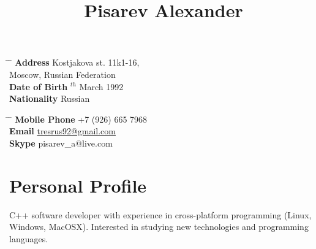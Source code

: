 \documentclass[10pt]{article} %
\begin{document}

\title{Pisarev Alexander} %


\parbox{0.5\textwidth}{ %
\begin{tabbing} %
\hspace{3cm} \= \hspace{4cm} \= \kill %
{\bf Address} \> Kostjakova st. 11k1-16,\\ %
\> Moscow, Russian Federation \\ %
{\bf Date of Birth} $^{th}$ March 1992 \\ %
{\bf Nationality} \> Russian %
\end{tabbing}}
\hfill %
\parbox{0.5\textwidth}{ %
\begin{tabbing} %
\hspace{3cm} \= \hspace{4cm} \= \kill %
{\bf Mobile Phone} \> +7 (926) 665 7968 \\ %
{\bf Email} \> \href{mailto:tresrus92@gmail.com}{tresrus92@gmail.com} \\ %
{\bf Skype} \> pisarev\_a@live.com \\ %
\end{tabbing}}


\section{Personal Profile}

C++ software developer with experience in cross-platform programming (Linux, Windows, MacOSX). Interested in studying new technologies and programming languages.

\end{document}
